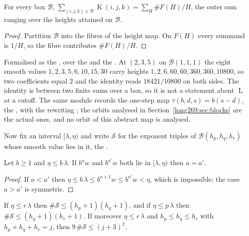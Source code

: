 \documentclass[11pt]{article}
\newcommand{\lo}{\lambda}
\newcommand{\hi}{\eta}
\newcommand{\Lprefix}{\operatorname{L}}
\newcommand{\Kernel}{\operatorname{K}}
\begin{document}
\begin{proposition}\label{long269:res:fibre}
For every box $\mathcal B$,
$\sum_{(i,j,k)\in\mathcal B}\Kernel(i,j,k)=\sum_{H}\#F(H)/H$, the outer sum
ranging over the heights attained on $\mathcal B$.
\end{proposition}

\begin{proof}
Partition $\mathcal B$ into the fibres of the height map.  On $F(H)$ every
summand is $1/H$, so the fibre contributes $\#F(H)/H$.
\end{proof}

\noindent Formalised as the
, over the
 and the
.  At $(2,3,5)$ on $\mathcal B(1,1,1)$ the eight smooth values
$1,2,3,5,6,10,15,30$ carry heights $1,2,6,60,60,360,360,10800$, so two
coefficients equal $2$ and the identity reads $18421/10800$ on both sides.  The
identity is between two finite sums over a box, so it is not a statement about
$\Lprefix$ at a cutoff.  The same module records the one-step map
$\tau(b,d,s)=b(s-d)$, the
, with the rewriting
; the orbits analysed in Section~\ref{long269:sec:blocks} are the actual
ones, and no orbit of this abstract map is analysed.

Now fix an interval $[\lo,\hi)$ and write $\mathcal S$ for the exponent triples
of $\mathcal B(h_p,h_q,h_r)$ whose smooth value lies in it, the
.

\begin{lemma}\label{long269:res:short}
Let $b\ge1$ and $\hi\le b\,\lo$.  If $b^{a}w$ and $b^{a'}w$ both lie in
$[\lo,\hi)$ then $a=a'$.
\end{lemma}

\begin{proof}
If $a<a'$ then $\hi\le b\,\lo\le b^{a+1}w\le b^{a'}w<\hi$, which is impossible;
the case $a>a'$ is symmetric.
\end{proof}

\begin{proposition}\label{long269:res:drop}
\label{long269:res:shell}
If $\hi\le r\,\lo$ then $\#\mathcal S\le(h_p+1)(h_q+1)$, and if
$\hi\le p\,\lo$ then $\#\mathcal S\le(h_q+1)(h_r+1)$.  If moreover
$\hi\le r\,\lo$ and $h_p\le h_q\le h_r$ with $h_p+h_q+h_r=j$, then
$9\,\#\mathcal S\le(j+3)^{2}$.
\end{proposition}
\end{document}
